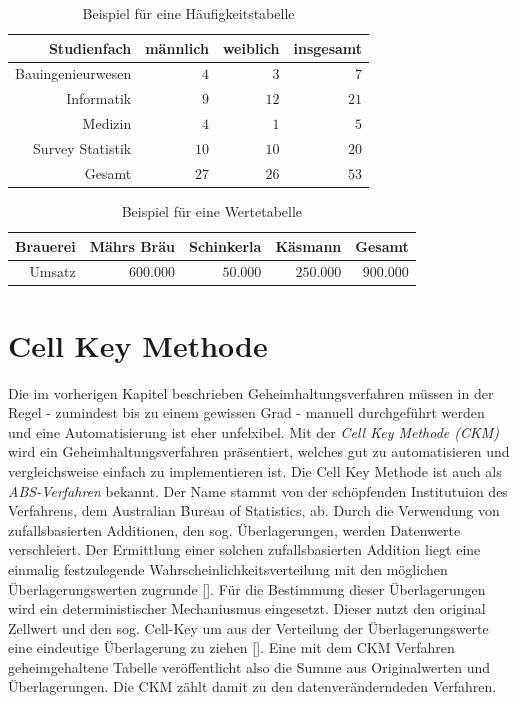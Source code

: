 \begin{table}[h]
    \centering
    \begin{tabular}{ r r r r }
        \textbf{Studienfach} \vline & \textbf{männlich} & \textbf{weiblich} & \textbf{insgesamt} \\ 
        \hline
        Bauingenieurwesen \vline & $4$ & $3$ & $7$ \\
        Informatik \vline & $9$ & $12$ & $21$ \\  
        Medizin \vline & $4$ & $1$ & $5$ \\
        Survey Statistik \vline & $10$ & $10$ & $20$ \\
        \hline
        Gesamt \vline & $27$ & $26$ & $53$
    \end{tabular}
    \caption{Beispiel für eine Häufigkeitstabelle}
\end{table}

\begin{table}[h]
    \centering
    \begin{tabular}{ r r r r r }
        \textbf{Brauerei} \vline & \textbf{Mährs Bräu} & \textbf{Schinkerla} & \textbf{Käsmann} & \textbf{Gesamt} \\ 
        \hline
        Umsatz \vline & $600.000$ & $50.000$ & $250.000$ & $900.000$
        \end{tabular}
    \caption{Beispiel für eine Wertetabelle}
\end{table}





\section{Cell Key Methode}

Die im vorherigen Kapitel beschrieben Geheimhaltungsverfahren müssen in der Regel - zumindest bis zu einem gewissen Grad - manuell durchgeführt werden und eine Automatisierung ist eher unfelxibel. Mit der \textit{Cell Key Methode (CKM)} wird ein Geheimhaltungsverfahren präsentiert, welches gut zu automatisieren und vergleichsweise einfach zu implementieren ist. Die Cell Key Methode ist auch als \textit{ABS-Verfahren} bekannt. Der Name stammt von der schöpfenden Institutuion des Verfahrens, dem Australian Bureau of Statistics, ab. Durch die Verwendung von zufallsbasierten Additionen, den sog. Überlagerungen, werden Datenwerte verschleiert. Der Ermittlung einer solchen zufallsbasierten Addition liegt eine einmalig festzulegende Wahrscheinlichkeitsverteilung mit den möglichen Überlagerungswerten zugrunde [\cite{Enderle}]. Für die Bestimmung dieser Überlagerungen wird ein deterministischer Mechaniusmus eingesetzt. Dieser nutzt den original Zellwert und den sog. Cell-Key um aus der Verteilung der Überlagerungswerte eine eindeutige Überlagerung zu ziehen [\cite{Enderle}]. Eine mit dem CKM Verfahren geheimgehaltene Tabelle veröffentlicht also die Summe aus Originalwerten und Überlagerungen. Die CKM zählt damit zu den datenveränderndeden Verfahren.

